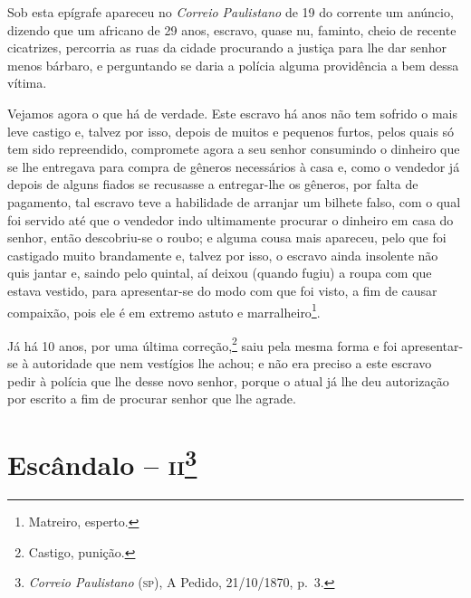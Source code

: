 {Sob esta epígrafe apareceu no \emph{Correio Paulistano} de 19 do
corrente um anúncio, dizendo que um africano de 29 anos, escravo, quase
nu, faminto, cheio de recente cicatrizes, percorria as ruas da cidade
procurando a justiça para lhe dar senhor menos bárbaro, e perguntando se
daria a polícia alguma providência a bem dessa vítima.

Vejamos agora o que há de verdade. Este escravo há anos não tem sofrido
o mais leve castigo e, talvez por isso, depois de muitos e pequenos
furtos, pelos quais só tem sido repreendido, compromete agora a seu
senhor consumindo o dinheiro que se lhe entregava para compra de gêneros
necessários à casa e, como o vendedor já depois de alguns fiados se
recusasse a entregar-lhe os gêneros, por falta de pagamento, tal escravo
teve a habilidade de arranjar um bilhete falso, com o qual foi servido
até que o vendedor indo ultimamente procurar o dinheiro em casa do
senhor, então descobriu-se o roubo; e alguma cousa mais apareceu, pelo
que foi castigado muito brandamente e, talvez por isso, o escravo ainda
insolente não quis jantar e, saindo pelo quintal, aí deixou (quando
fugiu) a roupa com que estava vestido, para apresentar-se do modo com
que foi visto, a fim de causar compaixão, pois ele é em extremo astuto e
marralheiro\footnote{ Matreiro, esperto.}.

Já há 10 anos, por uma última correção,\footnote{ Castigo, punição.}
saiu pela mesma forma e foi apresentar-se à autoridade que nem vestígios
lhe achou; e não era preciso a este escravo pedir à polícia que lhe
desse novo senhor, porque o atual já lhe deu autorização por escrito a
fim de procurar senhor que lhe agrade.

\asterisc{}

\chapter{Escândalo -- \textsc{ii}\footnote{\emph{Correio Paulistano} (\textsc{sp}), A Pedido, 21/10/1870,
  p.~3.}} %

}
